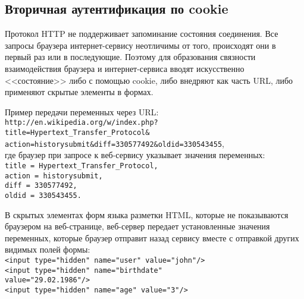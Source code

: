 \subsection{Вторичная аутентификация по cookie}

Протокол HTTP не поддерживает запоминание состояния соединения. Все запросы браузера интернет-сервису неотличимы от того, происходят они в первый раз или в последующие. Поэтому для образования связности взаимодействия браузера и интернет-сервиса вводят искусственно <<состояние>> либо с помощью cookie, либо внедряют как часть URL, либо применяют скрытые элементы в формах.

Пример передачи переменных через URL: \\
\texttt{http://en.wikipedia.org/w/index.php? \\
\hspace*{1 cm} title=Hypertext\_Transfer\_Protocol\& \\
\hspace*{1 cm} action=historysubmit\&diff=330577492\&oldid=330543455}, \\
где браузер при запросе к веб-сервису указывает значения переменных: \texttt{ \\
\hspace*{1 cm} title = Hypertext\_Transfer\_Protocol, \\
\hspace*{1 cm} action = historysubmit, \\
\hspace*{1 cm} diff = 330577492, \\
\hspace*{1 cm} oldid = 330543455.
}

В скрытых элементах форм языка разметки HTML, которые не показываются браузером на веб-странице, веб-сервер передает установленные значения переменных, которые браузер отправит назад сервису вместе с отправкой других видимых полей формы: \texttt{ \\
\hspace*{1 cm} <input type="hidden"\ name="user"\ value="john"/> \\
\hspace*{1 cm} <input type="hidden"\ name="birthdate" \\
\hspace*{2 cm}      value="29.02.1986"/> \\
\hspace*{1 cm} <input type="hidden"\ name="age"\ value="3"/>
}

